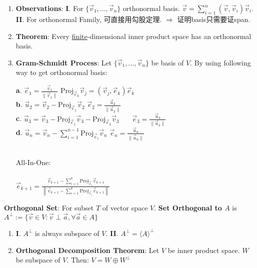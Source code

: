 \documentclass[9pt]{article}
\begin{document}
\begin{enumerate}[itemsep=-2pt, topsep=-2pt]
    \item \textbf{Observations}: \textbf{I}. {\small For $\{\vec{v}_1,...,\vec{v}_n\}$ orthonormal basis. \quad $\vec{v}=\sum_{i=1}^n(\vec{v},\vec{v}_i)\vec{v}_i$.} \qquad \textbf{II}. {\scriptsize For orthonormal Family, 可直接用勾股定理. $\Rightarrow$ 证明basis只需要证span.}
    \item \textbf{Theorem}: {\small Every \underline{finite}-dimensional inner product space has an orthonormal basis.}
    \item \textbf{Gram-Schmidt Process}: Let $\{\vec{v}_1,...,\vec{v}_n\}$ be basis of $V$. By using following way to get orthonormal basis: \\
    \vspace{-25pt}
    \begin{multicols}{2}
        \textbf{a}. $\vec{e}_1=\frac{\vec{v}_1}{\|\vec{v}_1\|}$ \hspace{100pt} $\text{Proj}_{\vec{e}_k}\vec{v}_j=(\vec{v}_j,\vec{e}_k)\vec{e}_k$ \\
        \textbf{b}. $\vec{u}_2=\vec{v}_2-\text{Proj}_{\vec{e}_1}\vec{v}_2$ \hspace{60pt} $\vec{e}_2=\frac{\vec{u}_2}{\|\vec{u}_2\|}$ \\
        \textbf{c}. $\vec{u}_3=\vec{v}_3-\text{Proj}_{\vec{e}_1}\vec{v}_3-\text{Proj}_{\vec{e}_2}\vec{v}_3$ \quad \ \ \ $\vec{e}_3=\frac{\vec{u}_3}{\|\vec{u}_3\|}$ \\
        \textbf{d}. $\vec{u}_n=\vec{v}_n-\sum_{i=1}^{n-1}\text{Proj}_{\vec{e}_i}\vec{v}_n$ \qquad\qquad $\vec{e}_n=\frac{\vec{u}_n}{\|\vec{u}_n\|}$
        
        \columnbreak

        ~\\All-In-One:\\~\\$\vec{e}_{k+1}=\frac{\vec{v}_{k+1}-\sum_{i=1}^k\text{Proj}_{\vec{e}_i}\vec{v}_{k+1}}{\left\|\vec{v}_{k+1}-\sum_{i=1}^k\text{Proj}_{\vec{e}_i}\vec{v}_{k+1}\right\|}$
    \end{multicols}
    \vspace{-10pt}
\end{enumerate}

\textbf{Orthogonal Set}: For subset $T$ of vector space $V$. \textbf{Set Orthogonal to $A$} is $A^\perp:=\{\vec{v}\in V:\vec{v}\perp\vec{a},\forall\vec{a}\in A\}$

\begin{enumerate}[itemsep=-2pt, topsep=-2pt]
    \item \textbf{I}. $A^\perp$ is always subspace of $V$. \qquad \textbf{II}. $A^\perp=\langle A\rangle^\perp$
    \item \textbf{Orthogonal Decomposition Theorem}: Let $V$ be inner product space. \quad $W$ be subspace of $V$. \quad Then: $V=W\oplus W^\perp$
\end{enumerate}
\end{document}

